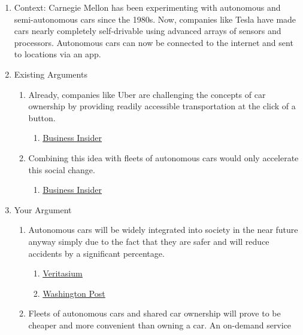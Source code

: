 \documentclass[letterpaper, 12pt]{article}
\begin{document}
\begin{enumerate}
\begin{enumerate}
    \item Context: Carnegie Mellon has been experimenting with autonomous and
      semi-autonomous cars since the 1980s. Now, companies like Tesla have made
      cars nearly completely self-drivable using advanced arrays of sensors and
      processors. Autonomous cars can now be connected to the internet and sent
      to locations via an app.
    \item Existing Arguments
    \begin{enumerate}
      \item Already, companies like Uber are challenging the concepts of car
        ownership by providing readily accessible transportation at the click
        of a button.
      \begin{enumerate}
        \item \href{http://www.businessinsider.com/ubers-plans-to-be-cheaper-than-owning-a-car-2015-2}{\underline{Business Insider}}
      \end{enumerate}
      \item Combining this idea with fleets of autonomous cars would only
        accelerate this social change.
      \begin{enumerate}
        \item \href{http://www.businessinsider.com/former-tesla-vp-georg-bauer-autonomy-will-kill-car-ownership-2016-11}{\underline{Business Insider}}
      \end{enumerate}
    \end{enumerate}
    \item Your Argument
    \begin{enumerate}
      \item Autonomous cars will be widely integrated into society in the near
        future anyway simply due to the fact that they are safer and will reduce
        accidents by a significant percentage.
      \begin{enumerate}
        \item \href{https://www.youtube.com/watch?v=WBjY3QGNdAw}{\underline{Veritasium}}
        \item \href{https://www.washingtonpost.com/news/innovations/wp/2017/02/20/the-big-moral-dilemma-facing-self-driving-cars/?utm_term=.802ae11b67c4}{\underline{Washington Post}}
      \end{enumerate}
      \item Fleets of autonomous cars and shared car ownership will prove to be
        cheaper and more convenient than owning a car. An on-demand service

\end{enumerate}
\end{enumerate}
\end{enumerate}
\end{document}
